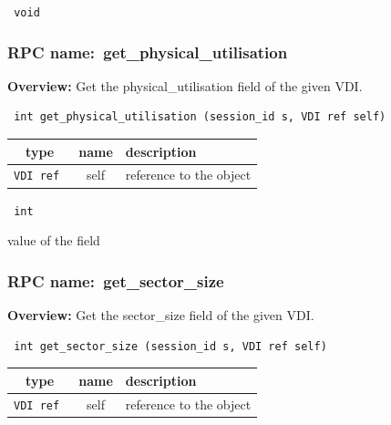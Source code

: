 \vspace{0.3cm}

{\tt 
void
}



\vspace{0.3cm}
\vspace{0.3cm}
\vspace{0.3cm}
\subsubsection{RPC name:~get\_physical\_utilisation}

{\bf Overview:} 
Get the physical\_utilisation field of the given VDI.

\begin{verbatim} int get_physical_utilisation (session_id s, VDI ref self)\end{verbatim}



 
\vspace{0.3cm}
\begin{tabular}{|c|c|p{7cm}|}
 \hline
{\bf type} & {\bf name} & {\bf description} \\ \hline
{\tt VDI ref } & self & reference to the object \\ \hline 

\end{tabular}

\vspace{0.3cm}

{\tt 
int
}


value of the field
\vspace{0.3cm}
\vspace{0.3cm}
\vspace{0.3cm}
\subsubsection{RPC name:~get\_sector\_size}

{\bf Overview:} 
Get the sector\_size field of the given VDI.

\begin{verbatim} int get_sector_size (session_id s, VDI ref self)\end{verbatim}



 
\vspace{0.3cm}
\begin{tabular}{|c|c|p{7cm}|}
 \hline
{\bf type} & {\bf name} & {\bf description} \\ \hline
{\tt VDI ref } & self & reference to the object \\ \hline 

\end{tabular}

